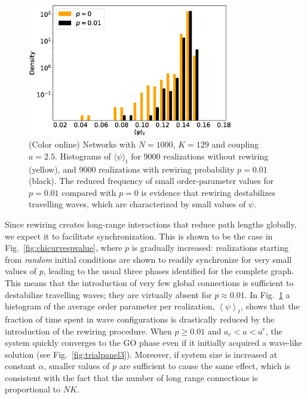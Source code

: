 \begin{figure}
\begin{center}
    \includegraphics[width=0.8\textwidth]{fig/articuno_figure_histogram.eps}
    \caption{\label{fig:histogram} (Color online) Networks with $N=1000$, $K=129$ and coupling $a=2.5$.  Histograms of $\langle \psi
        \rangle_t$ for 9000 realizations without rewiring (yellow), and 9000 realizations with rewiring probability $p=0.01$ (black).
        The reduced frequency of small order-parameter values for $p=0.01$ compared with $p=0$ is evidence that rewiring destabilizes
        travelling waves, which are characterized by small values of $\psi$.}
\end{center}
\end{figure}

Since rewiring creates long-range interactions that reduce path lengths globally, we expect it to facilitate synchronization. This is
shown to be the case in Fig.~\ref{fig:chicurvespvalue}, where $p$ is gradually increased: realizations starting from \textit{random}
initial conditions are shown to readily synchronize for very small values of $p$, leading to the usual three phases identified for the
complete graph. This means that the introduction of very few global connections is sufficient to destabilize travelling waves; they are
virtually absent for $p \approx 0.01$. In Fig.~\ref{fig:histogram} a histogram of the average order parameter per realization, $\left<
\psi \right>_t$, shows that the fraction of time spent in wave configurations is drastically reduced by the introduction of the
rewiring procedure. When $p\geq0.01$ and $a_c<a<a^c$, the system quickly converges to the  GO phase even if it initially acquired a
wave-like solution (see Fig.~\ref{fig:trialpanel3}). Moreover, if system size is increased at constant $\alpha$, smaller values of $p$
are sufficient to cause the same effect, which is consistent with the fact that the number of long range connections is proportional to
$NK$.

